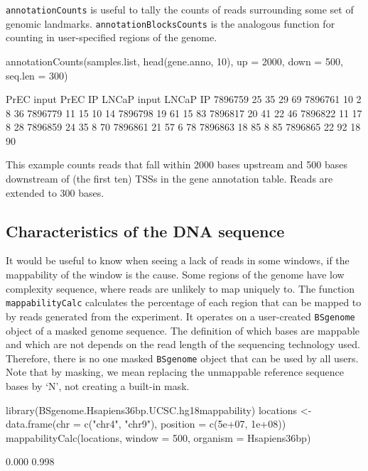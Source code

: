 \texttt{annotationCounts} is useful to tally the counts of reads surrounding some set of genomic landmarks. \texttt{annotationBlocksCounts} is the analogous function for counting in user-specified regions of the genome.

\begin{Schunk}
\begin{Sinput}
 annotationCounts(samples.list, head(gene.anno, 10), up = 2000, 
     down = 500, seq.len = 300)
\end{Sinput}
\begin{Soutput}
        PrEC input PrEC IP LNCaP input LNCaP IP
7896759         25      35          29       69
7896761         10       2           8       36
7896779         11      15          10       14
7896798         19      61          15       83
7896817         20      41          22       46
7896822         11      17           8       28
7896859         24      35           8       70
7896861         21      57           6       78
7896863         18      85           8       85
7896865         22      92          18       90
\end{Soutput}
\end{Schunk}
	
\noindent This example counts reads that fall within 2000 bases upstream and 500 bases downstream of (the first ten) TSSs in the gene annotation table.  Reads are extended to 300 bases.

\subsection{Characteristics of the DNA sequence}
It would be useful to know when seeing a lack of reads in some windows, if the mappability of the window is the cause. Some regions of the genome have low complexity sequence, where reads are unlikely to map uniquely to. The function \texttt{mappabilityCalc} calculates the percentage of each region that can be mapped to by reads generated from the experiment. It operates on a user-created \texttt{BSgenome} object of a masked genome sequence. The definition of which bases are mappable and which are not depends on the read length of the sequencing technology used. Therefore, there is no one masked \texttt{BSgenome} object that can be used by all users. Note that by masking, we mean replacing the unmappable reference sequence bases by `N', not creating a built-in mask.

\begin{Schunk}
\begin{Sinput}
 library(BSgenome.Hsapiens36bp.UCSC.hg18mappability)
 locations <- data.frame(chr = c("chr4", "chr9"), position = c(5e+07, 
     1e+08))
 mappabilityCalc(locations, window = 500, organism = Hsapiens36bp)
\end{Sinput}
\begin{Soutput}
[1] 0.000 0.998
\end{Soutput}
\end{Schunk}

